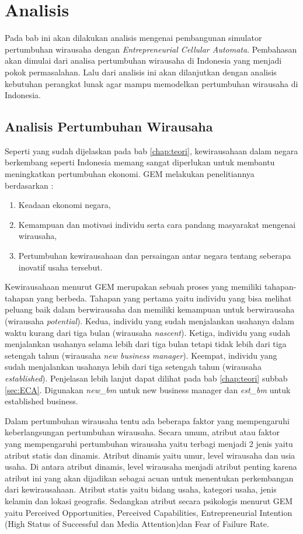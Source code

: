 \chapter{Analisis}
\label{chap:analisis}


Pada bab ini akan dilakukan analisis mengenai pembangunan simulator pertumbuhan wirausaha dengan \textit{Entrepreneurial Cellular Automata}. Pembahasan akan dimulai dari analisa pertumbuhan wirausaha di Indonesia yang menjadi pokok permasalahan. Lalu dari analisis ini akan dilanjutkan dengan analisis kebutuhan perangkat lunak agar mampu memodelkan pertumbuhan wirausaha di Indonesia.

\section{Analisis Pertumbuhan Wirausaha}
\label{sec:analisisPertumbuhanWirausaha}

Seperti yang sudah dijelaskan pada bab \ref{chap:teori}, kewirausahaan dalam negara berkembang seperti Indonesia memang sangat diperlukan untuk membantu meningkatkan pertumbuhan ekonomi. GEM melakukan penelitiannya berdasarkan :
\begin{enumerate}
	\item Keadaan ekonomi negara,
	\item Kemampuan dan motivasi individu serta cara pandang masyarakat mengenai wirausaha,
	\item Pertumbuhan kewirausahaan dan persaingan antar negara tentang seberapa inovatif usaha tersebut.
\end{enumerate}  

Kewirausahaan menurut GEM merupakan sebuah proses yang memiliki tahapan-tahapan yang berbeda. Tahapan yang pertama yaitu individu yang bisa melihat peluang baik dalam berwirausaha dan memiliki kemampuan untuk berwirausaha (wirausaha \textit{potential}). Kedua, individu yang sudah menjalankan usahanya dalam waktu kurang dari tiga bulan (wirausaha \textit{nascent}). Ketiga, individu yang sudah menjalankan usahanya selama lebih dari tiga bulan tetapi tidak lebih dari tiga setengah tahun (wirausaha \textit{new business manager}). Keempat, individu yang sudah menjalankan usahanya lebih dari tiga setengah tahun (wirausaha \textit{established}). Penjelasan lebih lanjut dapat dilihat pada bab \ref{chap:teori} subbab \ref{sec:ECA}. Digunakan \textit{new\_bm} untuk new business manager dan \textit{est\_bm} untuk established business. 


Dalam pertumbuhan wirausaha tentu ada beberapa faktor yang mempengaruhi keberlangsungan pertumbuhan wirausaha. Secara umum, atribut atau faktor yang mempengaruhi pertumbuhan wirausaha yaitu terbagi menjadi 2 jenis yaitu atribut statis dan dinamis. Atribut dinamis yaitu umur, level wirausaha dan usia usaha. Di antara atribut dinamis, level wirausaha menjadi atribut penting karena atribut ini yang akan dijadikan sebagai acuan untuk menentukan perkembangan dari kewirausahaan. Atribut statis yaitu bidang usaha, kategori usaha, jenis kelamin dan lokasi geografis. Sedangkan atribut secara psikologis menurut GEM yaitu Perceived Opportunities, Perceived Capabilities, Entrepreneurial Intention  (High Status of Successful dan Media Attention)dan Fear of Failure Rate. 


